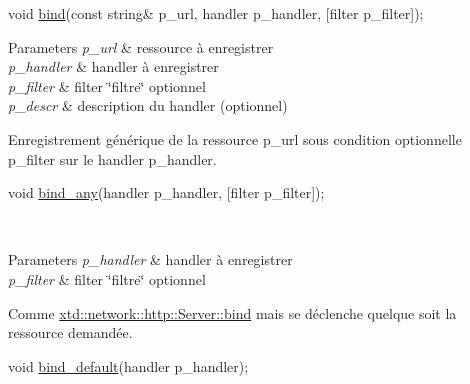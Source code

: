 \begin{DoxyItemize}
\item 
\begin{DoxyCode}
\textcolor{keywordtype}{void} \hyperlink{classxtd_1_1network_1_1http_1_1Server_aa964ab0b0c3ba29238cb2aae49181537}{bind}(\textcolor{keyword}{const} \textcolor{keywordtype}{string}& p\_url, handler p\_handler, [filter p\_filter]); 
\end{DoxyCode}
 
\begin{DoxyParams}{Parameters}
{\em p\+\_\+url} & ressource à enregistrer \\
\hline
{\em p\+\_\+handler} & handler à enregistrer \\
\hline
{\em p\+\_\+filter} & filter \char`\"{}filtre\char`\"{} optionnel \\
\hline
{\em p\+\_\+descr} & description du handler (optionnel)\\
\hline
\end{DoxyParams}
Enregistrement générique de la ressource p\+\_\+url sous condition optionnelle p\+\_\+filter sur le handler p\+\_\+handler. ~\newline
~\newline

\item 
\begin{DoxyCode}
\textcolor{keywordtype}{void} \hyperlink{classxtd_1_1network_1_1http_1_1Server_a6e448be2d0ca71f808bec243cefc4000}{bind\_any}(handler p\_handler, [filter p\_filter]); 
\end{DoxyCode}
 ~\newline
~\newline
 
\begin{DoxyParams}{Parameters}
{\em p\+\_\+handler} & handler à enregistrer \\
\hline
{\em p\+\_\+filter} & filter \char`\"{}filtre\char`\"{} optionnel\\
\hline
\end{DoxyParams}
Comme \hyperlink{classxtd_1_1network_1_1http_1_1Server_aa964ab0b0c3ba29238cb2aae49181537}{xtd\+::network\+::http\+::\+Server\+::bind} mais se déclenche quelque soit la ressource demandée. ~\newline
~\newline

\item 
\begin{DoxyCode}
\textcolor{keywordtype}{void} \hyperlink{classxtd_1_1network_1_1http_1_1Server_ab132be70e91c14a18638f93d28078b7b}{bind\_default}(handler p\_handler); 
\end{DoxyCode}
 ~\newline
~\newline
 

\end{DoxyItemize}

